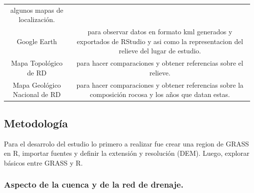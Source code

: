 \documentclass[11pt,]{article}
\begin{document}
\begin{longtable}[]{@{}cc@{}}
\begin{minipage}[t]{0.83\columnwidth}
algunos mapas de localización.\strut
\end{minipage}\tabularnewline
\begin{minipage}[t]{0.11\columnwidth}\centering\strut
Google Earth\strut
\end{minipage} & \begin{minipage}[t]{0.83\columnwidth}\centering\strut
para observar datos en formato kml generados y exportados de RStudio y
asi como la representacion del relieve del lugar de estudio.\strut
\end{minipage}\tabularnewline
\begin{minipage}[t]{0.11\columnwidth}\centering\strut
Mapa Topológico de RD\strut
\end{minipage} & \begin{minipage}[t]{0.83\columnwidth}\centering\strut
para hacer comparaciones y obtener referencias sobre el relieve.\strut
\end{minipage}\tabularnewline
\begin{minipage}[t]{0.11\columnwidth}\centering\strut
Mapa Geológico Nacional de RD\strut
\end{minipage} & \begin{minipage}[t]{0.83\columnwidth}\centering\strut
para hacer comparaciones y obtener referencias sobre la composición
rocosa y los años que datan estas.\strut
\end{minipage}\tabularnewline
\bottomrule
\end{longtable}

\subsection{Metodología}\label{metodologuxeda}

Para el desarrolo del estudio lo primero a realizar fue crear una region
de GRASS en R, importar fuentes y definir la extensión y resolución
(DEM). Luego, explorar básicos entre GRASS y R.

\subsubsection{Aspecto de la cuenca y de la red de
drenaje.}\label{aspecto-de-la-cuenca-y-de-la-red-de-drenaje.}
\end{document}
